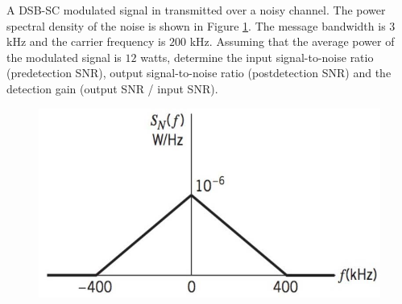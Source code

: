 \documentclass{assignment}
\begin{document}
\begin{prob}
    A DSB-SC modulated signal in transmitted over a noisy channel. The power spectral density of the noise is shown in Figure \ref{A-6-P-1}. The message bandwidth is $3$ kHz and the carrier frequency is $200$ kHz. Assuming that the average power of the modulated signal is $12$ watts, determine the input signal-to-noise ratio (predetection SNR), output signal-to-noise ratio (postdetection SNR) and the detection gain (output SNR / input SNR).
    \begin{figure}[h]
        \centering
        \includegraphics[width=.5\columnwidth]{A-6-P-1.jpg}
        \caption{}
        \label{A-6-P-1}
    \end{figure}
\end{prob}
\end{document}
